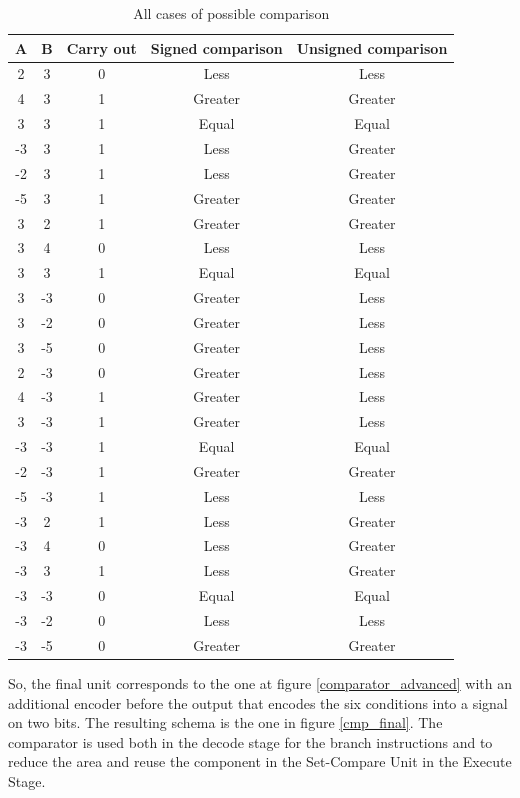 \begin{table}[H]
  \centering
  \begin{tabular}{c|c|c|c|c}
      \textbf{A} & \textbf{B} & \textbf{Carry out} & \textbf{Signed comparison} & \textbf{Unsigned comparison} \\
      \hline
      2 & 3 & 0 & Less & Less \\
      4 & 3 & 1 & Greater & Greater \\
      3 & 3 & 1 & Equal & Equal \\
      \rowcolor{red!50}
      -3 & 3 & 1 & Less & Greater \\
      \rowcolor{red!50}
      -2 & 3 & 1 & Less & Greater \\
      \rowcolor{red!50}
      -5 & 3 & 1 & Greater & Greater \\
      \hline
      3 & 2 & 1 & Greater & Greater \\
      3 & 4 & 0 & Less & Less \\
      3 & 3 & 1 & Equal & Equal \\
      \rowcolor{red!50}
      3 & -3 & 0 & Greater & Less \\
      \rowcolor{red!50}
      3 & -2 & 0 & Greater & Less \\
      \rowcolor{red!50}
      3 & -5 & 0 & Greater & Less \\
      \hline
      \rowcolor{red!50}
      2 & -3 & 0 & Greater & Less \\
      \rowcolor{red!50}
      4 & -3 & 1 & Greater & Less \\
      \rowcolor{red!50}
      3 & -3 & 1 & Greater & Less \\
      -3 & -3 & 1 & Equal & Equal \\
      -2 & -3 & 1 & Greater & Greater \\
      -5 & -3 & 1 & Less & Less \\
      \hline
      \rowcolor{red!50}
      -3 & 2 & 1 & Less & Greater \\
      \rowcolor{red!50}
      -3 & 4 & 0 & Less & Greater \\
      \rowcolor{red!50}
      -3 & 3 & 1 & Less & Greater \\
      -3 & -3 & 0 & Equal & Equal \\
      -3 & -2 & 0 & Less & Less \\
      -3 & -5 & 0 & Greater & Greater \\
  \end{tabular}
  \caption{All cases of possible comparison}
  \label{comparator_cases}
\end{table}
So, the final unit corresponds to the one at figure \ref{comparator_advanced} with an additional encoder before the output that encodes the six conditions into a signal on two bits. The resulting schema is the one in figure \ref{cmp_final}. The comparator is used both in the decode stage for the branch instructions and to reduce the area and reuse the component in the Set-Compare Unit in the Execute Stage.

